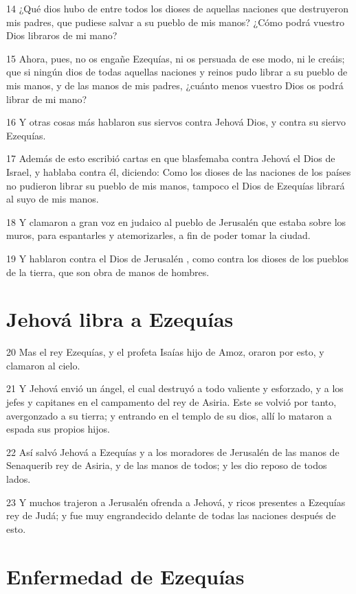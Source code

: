 \par 14 ¿Qué dios hubo de entre todos los dioses de aquellas naciones que destruyeron mis padres, que pudiese salvar a su pueblo de mis manos? ¿Cómo podrá vuestro Dios libraros de mi mano?
\par 15 Ahora, pues, no os engañe Ezequías, ni os persuada de ese modo, ni le creáis; que si ningún dios de todas aquellas naciones y reinos pudo librar a su pueblo de mis manos, y de las manos de mis padres, ¿cuánto menos vuestro Dios os podrá librar de mi mano?
\par 16 Y otras cosas más hablaron sus siervos contra Jehová Dios, y contra su siervo Ezequías.
\par 17 Además de esto escribió cartas en que blasfemaba contra Jehová el Dios de Israel, y hablaba contra él, diciendo: Como los dioses de las naciones de los países no pudieron librar su pueblo de mis manos, tampoco el Dios de Ezequías librará al suyo de mis manos.
\par 18 Y clamaron a gran voz en judaico al pueblo de Jerusalén  que estaba sobre los muros, para espantarles y atemorizarles, a fin de poder tomar la ciudad.
\par 19 Y hablaron contra el Dios de Jerusalén , como contra los dioses de los pueblos de la tierra, que son obra de manos de hombres.

\section*{Jehová libra a Ezequías }

\par 20 Mas el rey Ezequías, y el profeta Isaías hijo de Amoz, oraron por esto, y clamaron al cielo.
\par 21 Y Jehová envió un ángel, el cual destruyó a todo valiente y esforzado, y a los jefes y capitanes en el campamento del rey de Asiria. Este se volvió por tanto, avergonzado a su tierra; y entrando en el templo de su dios, allí lo mataron a espada sus propios hijos.
\par 22 Así salvó Jehová a Ezequías y a los moradores de Jerusalén  de las manos de Senaquerib rey de Asiria, y de las manos de todos; y les dio reposo de todos lados.
\par 23 Y muchos trajeron a Jerusalén ofrenda a Jehová, y ricos presentes a Ezequías rey de Judá; y fue muy engrandecido delante de todas las naciones después de esto.

\section*{Enfermedad de Ezequías }

